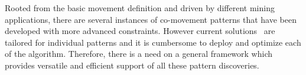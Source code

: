 %



Rooted from the basic movement definition and driven by different mining applications, there are several instances of co-movement patterns that have been developed with more advanced constraints. 
However current solutions~\cite{gudmundsson2006computing, jeung2008discovery, li2010swarm,wang2006grouppattern,li2015platoon} are tailored for individual patterns and it is cumbersome to deploy and optimize each of the algorithm. Therefore, there is a need on a general framework which provides versatile and efficient support of all these pattern discoveries. 

